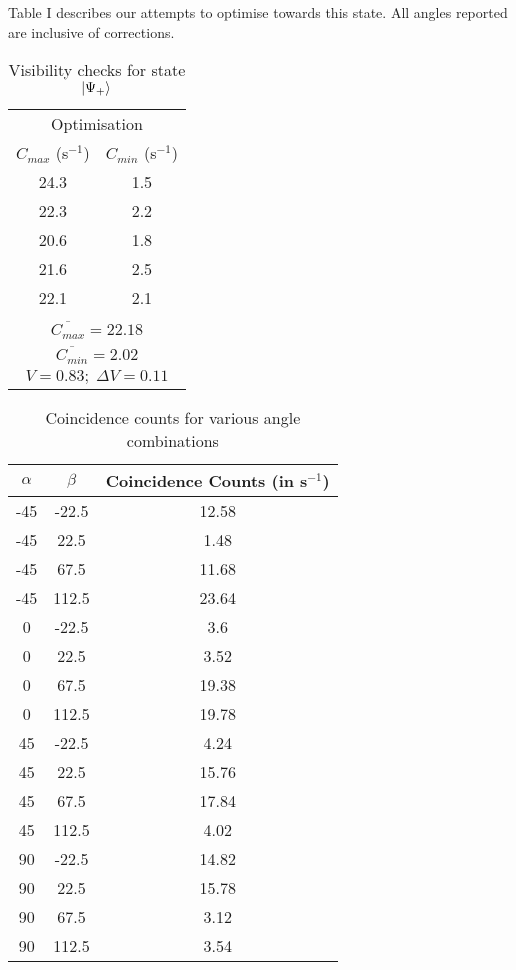 \documentclass[aps,prl,nofootinbib,twocolumn,superscriptaddress,groupedaddress]{revtex4}  %
\begin{document}
Table I describes our attempts to optimise towards this state. All angles reported are inclusive of corrections.
\begin{table}[H]
\centering
\begin{tabular}{|c|c|}
\hline
\multicolumn{2}{|c|}{Optimisation}\\
$C_{max}$ (s$^{-1}$) & $C_{min}$ (s$^{-1}$)\\
\hline
24.3 & 1.5 \\
22.3 & 2.2 \\
20.6 & 1.8 \\
21.6 & 2.5 \\
22.1 & 2.1 \\
\hline
\multicolumn{2}{|c|}{}\\[-2mm]
\multicolumn{2}{|c|}{$\overline{C_{max}} = 22.18$}\\
\multicolumn{2}{|c|}{$\overline{C_{min}} = 2.02$}\\
\multicolumn{2}{|c|}{$V = 0.83;\; \Delta V = 0.11$}\\
\hline
\end{tabular}
\caption{Visibility checks for state $\ket{\Psi_{+}}$}
\end{table}
\begin{table}[H]
\centering
\begin{tabular}{|c|c|c|}
\hline
$\alpha$ & $\beta$ & Coincidence Counts (in s$^{-1}$)\\
\hline
-45 & -22.5 & 12.58\\
-45 & 22.5 & 1.48\\
-45 & 67.5 & 11.68\\
-45 & 112.5 & 23.64\\
\hline
0 & -22.5 & 3.6\\
0 & 22.5 & 3.52\\
0 & 67.5 & 19.38\\
0 & 112.5 & 19.78\\
\hline
45 & -22.5 & 4.24\\
45 & 22.5 & 15.76\\
45 & 67.5 & 17.84\\
45 & 112.5 & 4.02\\
\hline
90 & -22.5 & 14.82\\
90 & 22.5 & 15.78\\
90 & 67.5 & 3.12\\
90 & 112.5 & 3.54\\
\hline
\end{tabular}
\caption{Coincidence counts for various angle combinations}
\end{table}
\end{document}
